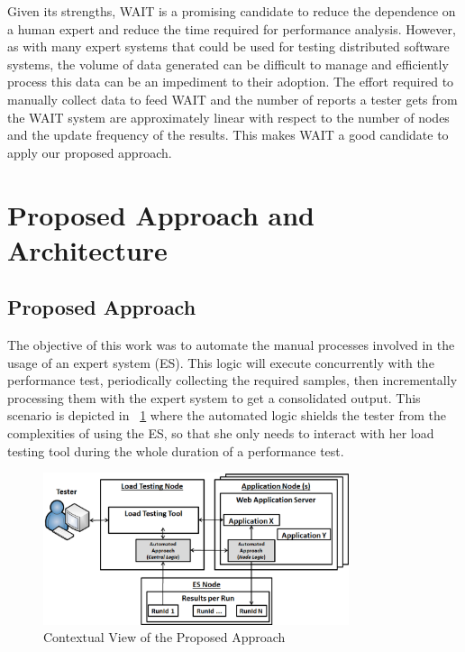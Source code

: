 \documentclass[runningheads,a4paper]{llncs}
\begin{document}
Given its strengths, WAIT is a promising candidate to reduce the
dependence on a human expert and reduce the time required for performance 
analysis. However, as with many expert systems that could be used for testing 
distributed software systems, the volume of data generated can be difficult to 
manage and efficiently process this data can be an impediment to their
adoption. The effort required to manually collect data to feed WAIT and the number 
of reports a tester gets from the WAIT system are approximately linear with
respect to the number of nodes and the update frequency of the results. This makes 
WAIT a good candidate to apply our proposed approach.


\vspace{-7pt}
\section{Proposed Approach and Architecture}
\label{ProposedApproach}
\vspace{-7pt}

\subsection{Proposed Approach}
\vspace{-7pt}
The objective of this work was to automate the manual processes involved
in the usage of an expert system (ES). This logic will execute concurrently with
the performance test, periodically collecting the required samples, then
incrementally processing them with the expert system to get a consolidated
output. This scenario is depicted in \figurename ~\ref{fig_Overview} where the
automated logic shields the tester from the complexities of using the ES, so
that she only needs to interact with her load testing tool during the whole duration 
of a performance test.

\begin{figure}[!h]
\centering
\includegraphics[totalheight=.20\textheight,width=0.8\textwidth]{architecture_dwait}
\caption{Contextual View of the Proposed Approach}
\label{fig_Overview}
\end{figure}
\end{document}
